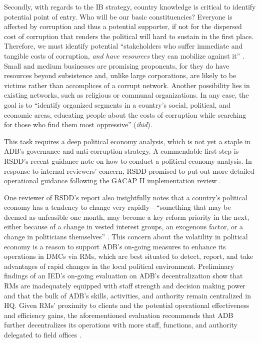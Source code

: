 \documentclass[12pt]{article}
\begin{document}
Secondly, with regards to the IB strategy, country knowledge is critical to identify potential point of entry. Who will be our basic constituencies? Everyone is affected by corruption and thus a potential supporter, if not for the dispersed cost of corruption that renders the political will hard to sustain in the first place. Therefore, we must identify potential ``stakeholders who suffer immediate and tangible costs of corruption, \textit{and have resources} they can mobilize against it'' \citep[7, emphasis added]{Johnston2002}. Small and medium businesses are promising proponents, for they do have resources beyond subsistence and, unlike large corporations, are likely to be victims rather than accomplices of a corrupt network. Another possibility lies in existing networks, such as religious or communal organizations. In any case, the goal is to ``identify organized segments in a country's social, political, and economic areas, educating people about the costs of corruption while searching for those who find them most oppressive'' (\textit{ibid}).

This task requires a deep political economy analysis, which is not yet a staple in ADB's governance and anti-corruption strategy. A commendable first step is RSDD's recent guidance note on how to conduct a political economy analysis. In response to internal reviewers' concern, RSDD promised to put out more detailed operational guidance following the GACAP II implementation review \citep{ADB-RSDD2013}.

One reviewer of RSDD's report also insightfully notes that a country's political economy has a tendency to change very rapidly---``something that may be deemed as unfeasible one month, may become a key reform priority in the next, either because of a change in vested interest groups, an exogenous factor, or a change in politicians themselves'' \citep[reviewers' comments]{ADB-RSDD2013}. This concern about the volatility in political economy is a reason to support ADB's on-going measures to enhance its operations in DMCs via RMs, which are best situated to detect, report, and take advantages of rapid changes in the local political environment. Preliminary findings of an IED's on-going evaluation on ADB's decentralization show that RMs are inadequately equipped with staff strength and decision making power and that the bulk of ADB's skills, activities, and authority remain centralized in HQ. Given RMs' proximity to clients and the potential operational effectiveness and efficiency gains, the aforementioned evaluation recommends that ADB further decentralizes its operations with more staff, functions, and authority delegated to field offices \citep{ADB-IED2013a}.
\end{document}
